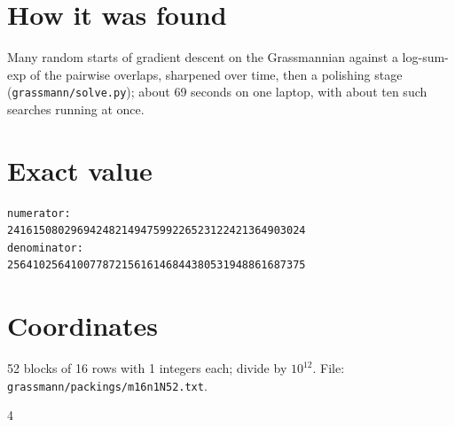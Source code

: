 \documentclass[11pt,a4paper]{article}
\begin{document}
\section{How it was found}
Many random starts of gradient descent on the Grassmannian against a log-sum-exp of the pairwise overlaps, sharpened over time, then a polishing stage (\texttt{grassmann/solve.py}); about 69 seconds on one laptop, with about ten such searches running at once.


\appendix
\section{Exact value}
{\small
\begin{verbatim}
numerator:
24161508029694248214947599226523122421364903024
denominator:
25641025641007787215616146844380531948861687375
\end{verbatim}}

\section{Coordinates}
52 blocks of 16 rows with 1 integers each; divide by $10^{12}$. File: \texttt{grassmann/packings/m16n1N52.txt}.
{\tiny
\begin{multicols}{4}
\end{multicols}}
\end{document}

